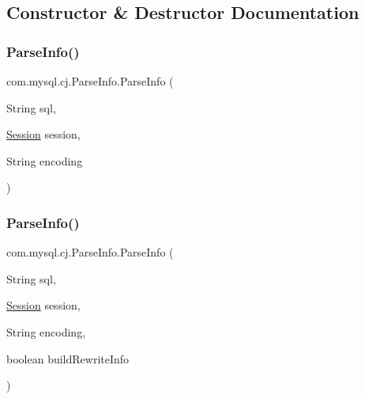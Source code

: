 \subsection{Constructor \& Destructor Documentation}
\mbox{\label{classcom_1_1mysql_1_1cj_1_1_parse_info_a2ad9d4e1a851a9a83dd98fa5680b2582}} 
\subsubsection{\texorpdfstring{Parse\+Info()}{ParseInfo()}\hspace{0.1cm}{\footnotesize\ttfamily [1/2]}}
{\footnotesize\ttfamily com.\+mysql.\+cj.\+Parse\+Info.\+Parse\+Info (\begin{DoxyParamCaption}\item[{String}]{sql,  }\item[{\mbox{\hyperlink{interfacecom_1_1mysql_1_1cj_1_1_session}{Session}}}]{session,  }\item[{String}]{encoding }\end{DoxyParamCaption})}

\mbox{\label{classcom_1_1mysql_1_1cj_1_1_parse_info_a3d8041c18abed49b875e46d462787547}} 
\subsubsection{\texorpdfstring{Parse\+Info()}{ParseInfo()}\hspace{0.1cm}{\footnotesize\ttfamily [2/2]}}
{\footnotesize\ttfamily com.\+mysql.\+cj.\+Parse\+Info.\+Parse\+Info (\begin{DoxyParamCaption}\item[{String}]{sql,  }\item[{\mbox{\hyperlink{interfacecom_1_1mysql_1_1cj_1_1_session}{Session}}}]{session,  }\item[{String}]{encoding,  }\item[{boolean}]{build\+Rewrite\+Info }\end{DoxyParamCaption})}



